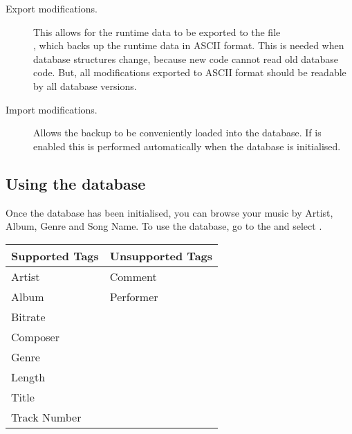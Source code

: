 \begin{description}
\item[Export modifications.]
  This allows for the runtime data to be exported to the file \\
  , which backs up the runtime data in
  ASCII format. This is needed when database structures change, because new
  code cannot read old database code. But, all modifications
  exported to ASCII format should be readable by all database versions.
  
\item[Import modifications.]
  Allows the  backup to be 
  conveniently loaded into the database. If  is
  enabled this is performed automatically when the database is initialised.
  
\end{description}

\subsection{Using the database}
Once the database has been initialised, you can browse your music by Artist, 
Album, Genre and Song Name. To use the database, go to the 
and select .\\

%
\begin{table}
\begin{center}
  \begin{tabularx}{.75\textwidth}{XX}%
  \toprule%
  \textbf{Supported Tags}   & \textbf{Unsupported Tags} \\
  \midrule
  Artist           & Comment \\
  Album            & Performer\\
  Bitrate          & \\
  Composer         & \\
  Genre            & \\
  Length           & \\
  Title            & \\
  Track Number     & \\
  \bottomrule
  \end{tabularx}
\end{center}
\end{table}

